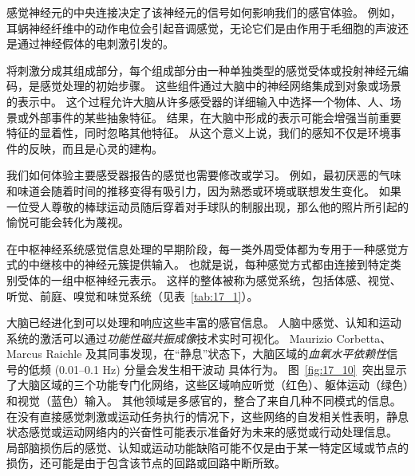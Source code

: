 感觉神经元的中央连接决定了该神经元的信号如何影响我们的感官体验。 
例如，耳蜗神经纤维中的动作电位会引起音调感觉，无论它们是由作用于毛细胞的声波还是通过神经假体的电刺激引发的。


将刺激分成其组成部分，每个组成部分由一种单独类型的感觉受体或投射神经元编码，是感觉处理的初始步骤。 
这些组件通过大脑中的神经网络集成到对象或场景的表示中。 
这个过程允许大脑从许多感受器的详细输入中选择一个物体、人、场景或外部事件的某些抽象特征。 
结果，在大脑中形成的表示可能会增强当前重要特征的显着性，同时忽略其他特征。 
从这个意义上说，我们的感知不仅是环境事件的反映，而且是心灵的建构。


我们如何体验主要感受器报告的感觉也需要修改或学习。 
例如，最初厌恶的气味和味道会随着时间的推移变得有吸引力，因为熟悉或环境或联想发生变化。 
如果一位受人尊敬的棒球运动员随后穿着对手球队的制服出现，那么他的照片所引起的愉悦可能会转化为蔑视。


在中枢神经系统感觉信息处理的早期阶段，每一类外周受体都为专用于一种感觉方式的中继核中的神经元簇提供输入。 
也就是说，每种感觉方式都由连接到特定类别受体的一组中枢神经元表示。 
这样的整体被称为感觉系统，包括体感、视觉、听觉、前庭、嗅觉和味觉系统（见表~\ref{tab:17_1}）。


大脑已经进化到可以处理和响应这些丰富的感官信息。 
人脑中感觉、认知和运动系统的激活可以通过\textit{功能性磁共振成像}技术实时可视化。 
Maurizio Corbetta、Marcus Raichle 及其同事发现，在“静息”状态下，大脑区域的\textit{血氧水平依赖性}信号的低频 (0.01–0.1 Hz) 分量会发生相干波动 具体行为。 
图~\ref{fig:17_10}~突出显示了大脑区域的三个功能专门化网络，这些区域响应听觉（红色）、躯体运动（绿色）和视觉（蓝色）输入。 
其他领域是多感官的，整合了来自几种不同模式的信息。 
在没有直接感觉刺激或运动任务执行的情况下，这些网络的自发相关性表明，静息状态感觉或运动网络内的兴奋性可能表示准备好为未来的感觉或行动处理信息。 
局部脑损伤后的感觉、认知或运动功能缺陷可能不仅是由于某一特定区域或节点的损伤，还可能是由于包含该节点的回路或回路中断所致。


